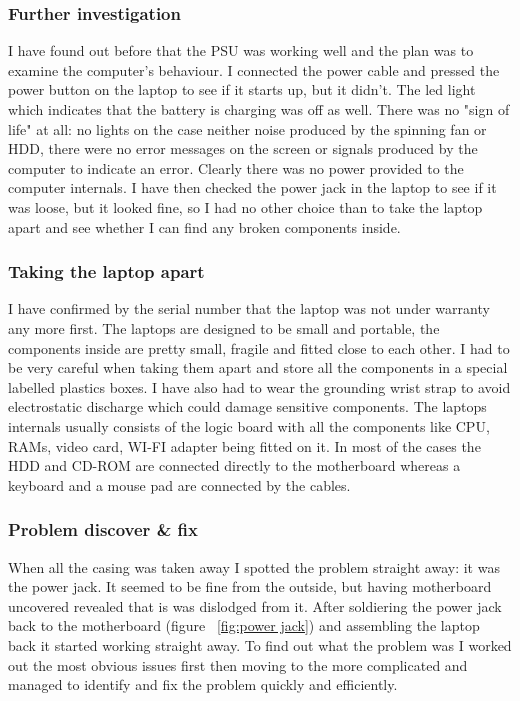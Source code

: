\documentclass[10pt,a4paper,headinclude=true]{report}
\begin{document}
\subsubsection{Further investigation}
I have found out before that the PSU was working well and the plan was to examine the computer's behaviour. I connected the power cable and pressed the power button on the laptop to see if it starts up, but it didn't. The led light which indicates that the battery is charging was off as well. There was no "sign of life" at all: no lights on the case neither noise produced by the spinning fan or HDD, there were no error messages on the screen or signals produced by the computer to indicate an error. Clearly there was no power provided to the computer internals. I have then checked the power jack in the laptop to see if it was loose, but it looked fine, so I had no other choice than to take the laptop apart and see whether I can find any broken components inside. 
\subsubsection{Taking the laptop apart}
I have confirmed by the serial number that the laptop was not under warranty any more first. The laptops are designed to be small and portable, the components inside are pretty small, fragile and fitted close to each other. I had to be very careful when taking them apart and store all the components in a special labelled plastics boxes. I have also had to wear the grounding wrist strap to avoid electrostatic discharge which could damage sensitive components. The laptops internals usually consists of the logic board with all the components like CPU, RAMs, video card, WI-FI adapter being fitted on it. In most of the cases the HDD and CD-ROM are connected directly to the motherboard whereas a keyboard and a mouse pad are connected by the cables. 
\subsubsection{Problem discover \& fix}
When all the casing was taken away I spotted the problem straight away: it was the power jack. It seemed to be fine from the outside, but having motherboard uncovered revealed that is was dislodged from it. After soldiering the power jack back to the motherboard (figure ~\ref{fig:power jack}) and assembling the laptop back it started working straight away. To find out what the problem was I worked out the most obvious issues first then moving to the more complicated and managed to identify and fix the problem quickly and efficiently.
\end{document}
